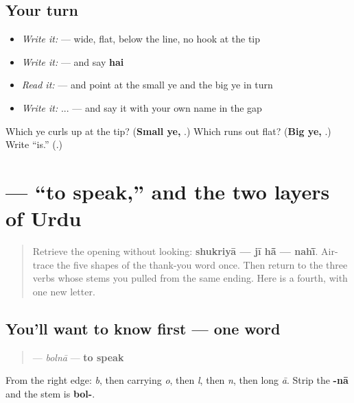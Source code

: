 \subsection*{Your turn}
\begin{itemize}
\raggedright
  \item \emph{Write it:}  — wide, flat, below the line, no hook at the tip
  \item \emph{Write it:}  — and say \textbf{hai}
  \item \emph{Read it:}  — and point at the small ye and the big ye in turn
  \item \emph{Write it:}   ...  — and say it with your own name in the gap
\end{itemize}

\begin{tcolorbox}[breakable,colback=teal!4,colframe=teal!35!black,title={Before you move on}]
Which ye curls up at the tip? (\textbf{Small ye, }.) Which runs out flat? (\textbf{Big ye, }.) Write \textquotedblleft{}is.\textquotedblright{} (\textbf{}.)
\end{tcolorbox}
\section[\texorpdfstring{\ur{بولنا} (bolnā)}{بولنا (bolnā)}]{ — “to speak,” and the two layers of Urdu}

\label{lesson:UR-C06-bolna}



\begin{quote}
Retrieve the opening without looking: \textbf{shukriyā — jī hā̃ — nahī̃}. Air-trace the five shapes of the thank-you word once. Then return to the three verbs whose stems you pulled from the same ending. Here is a fourth, with one new letter.
\end{quote}

\subsection*{You'll want to know first — one word}
\begin{quote}
\textbf{} — \emph{bolnā} — \textbf{to speak}
\end{quote}

From the right edge: \textbf{} \emph{b}, then \textbf{} carrying \emph{o}, then \textbf{} \emph{l}, then \textbf{} \emph{n}, then \textbf{} long \emph{ā}. Strip the \textbf{-nā} and the stem is \textbf{bol-}.

